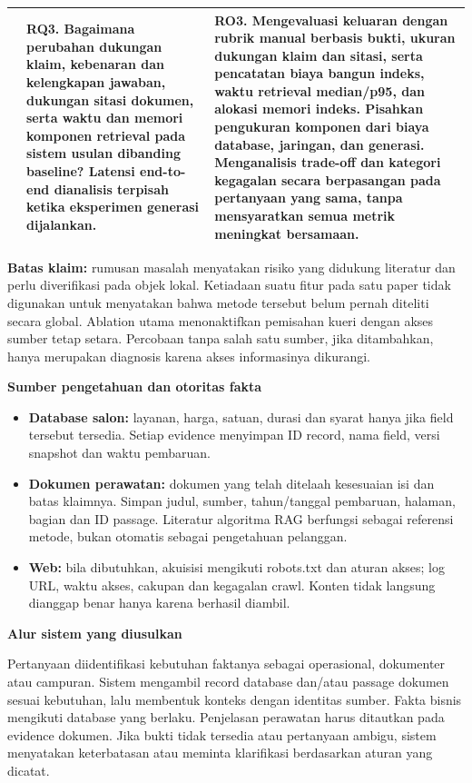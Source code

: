 \documentclass[11pt,a4paper]{article}
\newcommand{\heading}[1]{\vspace{5pt}{\large\bfseries #1}\par\vspace{1pt}}
\newcommand{\subheading}[1]{\vspace{3pt}\textbf{#1}\par}
\begin{document}
\begin{landscape}
\begin{tabularx}{\linewidth}{|>{\raggedright\arraybackslash}X|>{\raggedright\arraybackslash}X|>{\raggedright\arraybackslash}X|}
&
\textbf{RQ3.} Bagaimana perubahan dukungan klaim, kebenaran dan kelengkapan jawaban, dukungan sitasi dokumen, serta waktu dan memori komponen retrieval pada sistem usulan dibanding baseline? Latensi end-to-end dianalisis terpisah ketika eksperimen generasi dijalankan.
&
\textbf{RO3.} Mengevaluasi keluaran dengan rubrik manual berbasis bukti, ukuran dukungan klaim dan sitasi, serta pencatatan biaya bangun indeks, waktu retrieval median/p95, dan alokasi memori indeks. Pisahkan pengukuran komponen dari biaya database, jaringan, dan generasi. Menganalisis trade-off dan kategori kegagalan secara berpasangan pada pertanyaan yang sama, tanpa mensyaratkan semua metrik meningkat bersamaan.
\\\hline
\end{tabularx}

\vspace{6pt}
\textbf{Batas klaim:} rumusan masalah menyatakan risiko yang didukung literatur dan perlu diverifikasi pada objek lokal. Ketiadaan suatu fitur pada satu paper tidak digunakan untuk menyatakan bahwa metode tersebut belum pernah diteliti secara global. Ablation utama menonaktifkan pemisahan kueri dengan akses sumber tetap setara. Percobaan tanpa salah satu sumber, jika ditambahkan, hanya merupakan diagnosis karena akses informasinya dikurangi.
\end{landscape}

\clearpage
\heading{Rancangan Metode dan Batas Penelitian}
\subheading{Sumber pengetahuan dan otoritas fakta}
\begin{itemize}
\item \textbf{Database salon:} layanan, harga, satuan, durasi dan syarat hanya jika field tersebut tersedia. Setiap evidence menyimpan ID record, nama field, versi snapshot dan waktu pembaruan.
\item \textbf{Dokumen perawatan:} dokumen yang telah ditelaah kesesuaian isi dan batas klaimnya. Simpan judul, sumber, tahun/tanggal pembaruan, halaman, bagian dan ID passage. Literatur algoritma RAG berfungsi sebagai referensi metode, bukan otomatis sebagai pengetahuan pelanggan.
\item \textbf{Web:} bila dibutuhkan, akuisisi mengikuti robots.txt dan aturan akses; log URL, waktu akses, cakupan dan kegagalan crawl. Konten tidak langsung dianggap benar hanya karena berhasil diambil.
\end{itemize}

\subheading{Alur sistem yang diusulkan}
Pertanyaan diidentifikasi kebutuhan faktanya sebagai operasional, dokumenter atau campuran. Sistem mengambil record database dan/atau passage dokumen sesuai kebutuhan, lalu membentuk konteks dengan identitas sumber. Fakta bisnis mengikuti database yang berlaku. Penjelasan perawatan harus ditautkan pada evidence dokumen. Jika bukti tidak tersedia atau pertanyaan ambigu, sistem menyatakan keterbatasan atau meminta klarifikasi berdasarkan aturan yang dicatat.
\end{document}
